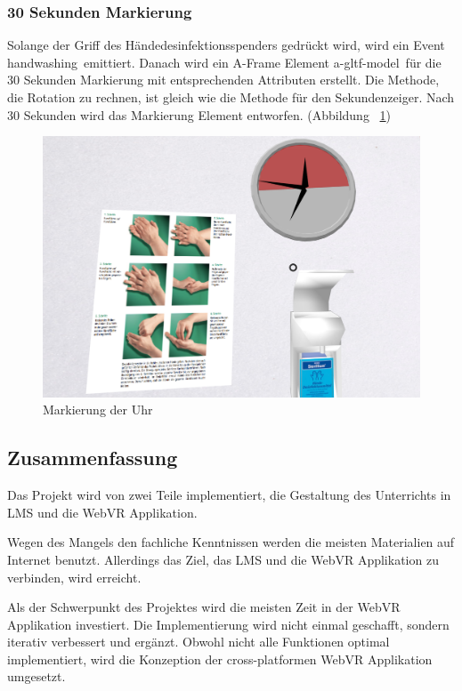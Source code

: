  \subsubsection{30 Sekunden Markierung}
 Solange der Griff des Händedesinfektionsspenders gedrückt wird, wird ein Event \glqq handwashing\grqq\ emittiert. Danach wird ein A-Frame Element \glqq a-gltf-model\grqq\ für die 30 Sekunden Markierung mit entsprechenden Attributen  erstellt. Die Methode, die Rotation zu rechnen, ist gleich wie die Methode für den Sekundenzeiger. Nach 30 Sekunden wird das Markierung Element entworfen. (Abbildung ~\ref{fig:clockMarker})
 
\begin{figure}[ht]
\vspace*{0.2cm}
\centering
\includegraphics[width=\textwidth]{images/clockMarker.png}
\caption[Markierung der Uhr]{Markierung der Uhr}
\label{fig:clockMarker} 
\end{figure}

\subsection{Zusammenfassung}
Das Projekt wird von zwei Teile implementiert, die Gestaltung des Unterrichts in LMS und die WebVR Applikation.

Wegen des Mangels den fachliche Kenntnissen werden die meisten Materialien auf Internet benutzt. Allerdings das Ziel, das LMS und die WebVR Applikation zu verbinden, wird erreicht.

Als der Schwerpunkt des Projektes wird die meisten Zeit in der WebVR Applikation investiert. Die Implementierung wird nicht einmal geschafft, sondern iterativ verbessert und ergänzt. Obwohl nicht alle Funktionen optimal implementiert, wird die Konzeption der cross-platformen WebVR Applikation umgesetzt.
